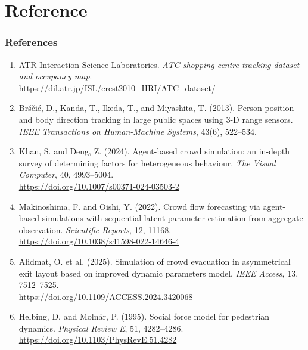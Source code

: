 \documentclass[aspectratio=43]{beamer}
\begin{document}
\section{Reference}
\begin{frame}\frametitle{References}
\small
{\scriptsize
\begin{enumerate}
\setlength{\itemsep}{0.04cm}
\item ATR Interaction Science Laboratories. \emph{ATC shopping-centre tracking dataset and occupancy map}.\\[-1pt]
\url{https://dil.atr.jp/ISL/crest2010_HRI/ATC_dataset/}
\item Br\v{s}\v{c}i\'c, D., Kanda, T., Ikeda, T., and Miyashita, T. (2013). Person position and body direction tracking in large public spaces using 3-D range sensors. \emph{IEEE Transactions on Human-Machine Systems}, 43(6), 522--534.
\item Khan, S. and Deng, Z. (2024). Agent-based crowd simulation: an in-depth survey of determining factors for heterogeneous behaviour. \emph{The Visual Computer}, 40, 4993--5004.\\[-1pt]
\url{https://doi.org/10.1007/s00371-024-03503-2}
\item Makinoshima, F. and Oishi, Y. (2022). Crowd flow forecasting via agent-based simulations with sequential latent parameter estimation from aggregate observation. \emph{Scientific Reports}, 12, 11168.\\[-1pt]
\url{https://doi.org/10.1038/s41598-022-14646-4}
\item Alidmat, O. et al. (2025). Simulation of crowd evacuation in asymmetrical exit layout based on improved dynamic parameters model. \emph{IEEE Access}, 13, 7512--7525.\\
\url{https://doi.org/10.1109/ACCESS.2024.3420068}
\item Helbing, D. and Moln\'ar, P. (1995). Social force model for pedestrian dynamics. \emph{Physical Review E}, 51, 4282--4286.\\
\url{https://doi.org/10.1103/PhysRevE.51.4282}
\end{enumerate}
}
\end{frame}
\end{document}
